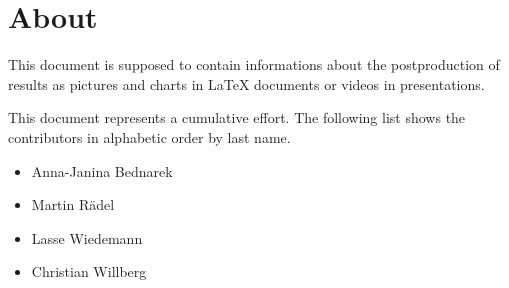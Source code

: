 \chapter{About}
\setcounter{currentlevel}{6}


This document is supposed to contain informations about the postproduction of \toolname{} results as pictures and charts in \LaTeX{} documents or videos in presentations.


This document represents a cumulative effort. The following list shows the contributors in alphabetic order by last name.

\begin{itemize}[noitemsep]
  \item Anna-Janina Bednarek
  \item Martin R\"{a}del
  \item Lasse Wiedemann
  \item Christian Willberg
\end{itemize}